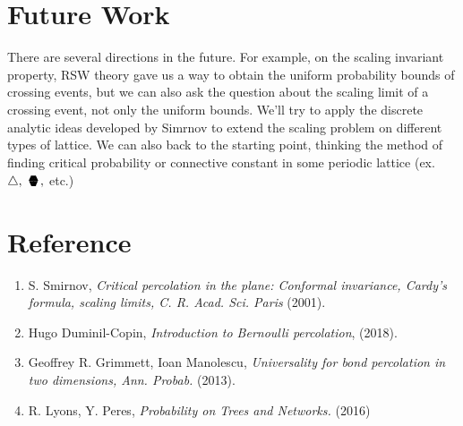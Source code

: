 \documentclass[12pt]{article}
\newcommand{\sixedge}{\mbox{\parbox[t][-2pt][c]{10pt}{\scriptsize$\blacktriangledown\hspace{-3.6pt}\blacktriangle\hspace{-4pt}\blacktriangledown$}\hspace{-10.2pt}\parbox[b][10.7pt][c]{10pt}{\scriptsize$\blacktriangle\hspace{-3.6pt}\blacktriangledown\hspace{-3.6pt}\blacktriangle$}}}
\theoremstyle{plane}
\theoremstyle{definition}
\begin{document}
\section{Future Work}

There are several directions in the future. For example, on the scaling invariant property, RSW theory gave us a way to obtain the uniform probability bounds of crossing events, but we can also ask the question about the scaling limit of a crossing event, not only the uniform bounds. We'll try to apply the discrete analytic ideas developed by Simrnov to extend the scaling problem on different types of lattice.
We can also back to the starting point, thinking the method of finding critical probability or connective constant in some periodic lattice (ex. $\triangle,\ \sixedge,$ etc.) 

\section*{Reference}

\begin{enumerate}
\item S. Smirnov, \textit{Critical percolation in the plane: Conformal invariance, Cardy's formula, scaling limits, C. R. Acad. Sci. Paris} (2001).
\item Hugo Duminil-Copin, \textit{Introduction to Bernoulli percolation}, (2018).
\item Geoffrey R. Grimmett, Ioan Manolescu, \textit{Universality for bond percolation in two dimensions, Ann. Probab.} (2013).
\item R. Lyons, Y. Peres, \textit{Probability on Trees and Networks.} (2016)
\end{enumerate}
\end{document}
